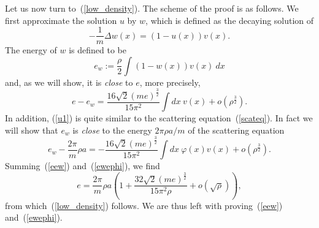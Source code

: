 \documentclass{ian}
\begin{document}
  \point
  Let us now turn to\-~(\ref{low_density}).
  The scheme of the proof is as follows.
  We first approximate the solution $u$ by $w$, which is defined as the decaying solution of
  \begin{equation}
    -\frac1m\Delta w(x)=(1-u(x))v(x)
    .
    \label{u1}
  \end{equation}
  The energy of $w$ is defined to be
  \begin{equation}
    e_w:=\frac\rho2\int(1-w(x))v(x)\ dx
    \label{ew}
  \end{equation}
  and, as we will show, it is {\it close} to $e$, more precisely,
  \begin{equation}
    e-e_w=\frac{16\sqrt 2(me)^{\frac32}}{15\pi^2}\int dx\ v(x)+o(\rho^{\frac32})
    .
    \label{eew}
  \end{equation}
  In addition, (\ref{u1}) is quite similar to the scattering equation\-~(\ref{scateq}).
  In fact we will show that $e_w$ is {\it close} to the energy $2\pi\rho a/m$ of the scattering equation
  \begin{equation}
    e_w-\frac{2\pi}m\rho a
    =
    -\frac{16\sqrt 2(me)^{\frac32}}{15\pi^2}\int dx\ \varphi(x) v(x)+o(\rho^{\frac32})
    .
    \label{ewephi}
  \end{equation}
  Summing\-~(\ref{eew}) and\-~(\ref{ewephi}), we find
  \begin{equation}
    e=\frac{2\pi}m\rho a\left(1+\frac{32\sqrt 2(me)^{\frac32}}{15\pi^2\rho}+o(\sqrt\rho)\right)
    ,
  \end{equation}
  from which\-~(\ref{low_density}) follows.
  We are thus left with proving\-~(\ref{eew}) and\-~(\ref{ewephi}).
  \bigskip
\end{document}
